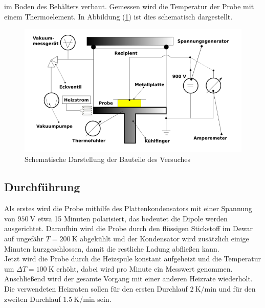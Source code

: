 im Boden des Behälters verbaut. Gemessen wird die Temperatur der Probe mit einem Thermoelement. In Abbildung (\ref{fig:schema48}) ist dies schematisch dargestellt.
\begin{figure}[h!]
  \centering
  \includegraphics[scale=0.5]{fig/schemav48.png}
  \caption{Schematische Darstellung der Bauteile des Versuches \cite[3]{Anleitung1}}
  \label{fig:schema48}
\end{figure}
\subsection{Durchführung}
\label{sec:durchff2}
Als erstes wird die Probe mithilfe des Plattenkondensators mit einer Spannung von $\SI{950}{\volt}$ etwa 15 Minuten polarisiert, das bedeutet die Dipole werden ausgerichtet. Daraufhin wird die Probe durch den flüssigen Stickstoff im Dewar auf ungefähr $T=\SI{200}{\kelvin}$ abgekühlt und der Kondensator wird zusätzlich einige Minuten kurzgeschlossen, damit die restliche Ladung abfließen kann. \\
Jetzt wird die Probe durch die Heizspule konstant aufgeheizt und die Temperatur um $\Delta T=\SI{100}{\kelvin}$ erhöht, dabei wird pro Minute ein Messwert genommen. Anschließend wird der gesamte Vorgang mit einer
anderen Heizrate wiederholt. Die verwendeten Heizraten sollen für den ersten Durchlauf $\SI{2}{\kelvin\per\minute}$ und für den zweiten Durchlauf $\SI{1.5}{\kelvin\per\minute}$ sein.
